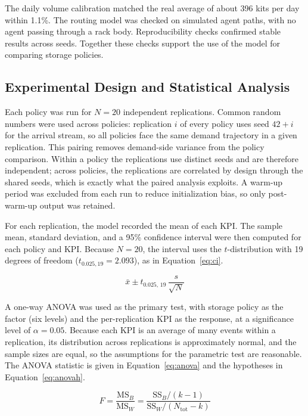 \documentclass[12pt,a4paper]{article}
\begin{document}
The daily volume calibration matched the real average of about 396 kits per
day within 1.1\%. The routing model was checked on simulated agent paths, with
no agent passing through a rack body. Reproducibility checks confirmed stable
results across seeds. Together these checks support the use of the model for
comparing storage policies.

\subsection{Experimental Design and Statistical Analysis}
\label{sec:expdesign}
Each policy was run for $N=20$ independent replications. Common random numbers
were used across policies: replication $i$ of every policy uses seed
$42+i$ for the arrival stream, so all policies face the same demand
trajectory in a given replication. This pairing removes demand-side variance
from the policy comparison. Within a policy the replications use distinct
seeds and are therefore independent; across policies, the replications are
correlated by design through the shared seeds, which is exactly what the
paired analysis exploits. A warm-up period was excluded from each run to
reduce initialization bias, so only post-warm-up output was retained.

For each replication, the model recorded the mean of each KPI. The sample
mean, standard deviation, and a 95\% confidence interval were then computed
for each policy and KPI. Because $N=20$, the interval uses the
$t$-distribution with 19 degrees of freedom ($t_{0.025,19}=2.093$), as in
Equation~\eqref{eq:ci}.

\begin{equation}
\label{eq:ci}
\bar{x} \pm t_{0.025,\,19}\,\frac{s}{\sqrt{N}}
\end{equation}

A one-way ANOVA was used as the primary test, with storage policy as the
factor (six levels) and the per-replication KPI as the response, at a
significance level of $\alpha=0.05$. Because each KPI is an average of many
events within a replication, its distribution across replications is
approximately normal, and the sample sizes are equal, so the assumptions for
the parametric test are reasonable. The ANOVA statistic is given in
Equation~\eqref{eq:anova} and the hypotheses in Equation~\eqref{eq:anovah}.

\begin{equation}
\label{eq:anova}
F = \frac{\mathrm{MS}_{B}}{\mathrm{MS}_{W}}
  = \frac{\mathrm{SS}_{B}/(k-1)}{\mathrm{SS}_{W}/(N_{\text{tot}}-k)}
\end{equation}
\end{document}
